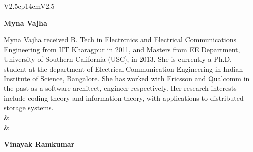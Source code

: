\begin{tabular}{V{2.5}cp{14cm}V{2.5}}
\centerline{\large\bf Myna Vajha}

\bigskip
Myna Vajha received B. Tech in Electronics and Electrical Communications Engineering from IIT Kharagpur in 2011, and Masters from EE Department, University of Southern California (USC), in 2013. She is currently a Ph.D. student at the department of Electrical Communication Engineering in Indian Institute of Science, Bangalore. She has worked with Ericsson and Qualcomm in the past as a software architect, engineer respectively. Her research interests include coding theory and information theory, with applications to distributed storage systems.\\
 &\\
 & 

\centerline{\large\bf Vinayak Ramkumar}


\end{tabular}
